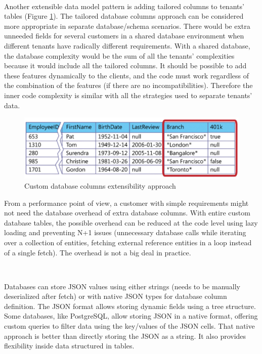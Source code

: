 \documentclass[12pt,english]{article} %
\begin{document}
\

Another extensible data model pattern is adding tailored columns to tenants' tables (Figure \ref{fig:custom-database-columns}).
The tailored database columns approach can be considered more appropriate in separate database/schema scenarios.
There would be extra unneeded fields for several customers in a shared database environment when different tenants have radically different requirements.
With a shared database, the database complexity would be the sum of all the tenants' complexities because it would include all the tailored columns.
It should be possible to add these features dynamically to the clients, and the code must work regardless of the combination of the features (if there are no incompatibilities).
Therefore the inner code complexity is similar with all the strategies used to separate tenants' data.

\begin{figure}[H]
    \centering
    \includegraphics[scale=0.5]{img/db/extensibility/custom-database-columns.png}
    \caption{Custom database columns extensibility approach \cite{multi-tenant-data-architecture}}
    \label{fig:custom-database-columns}
\end{figure}

From a performance point of view, a customer with simple requirements might not need the database overhead of extra database columns. 
With entire custom database tables, the possible overhead can be reduced at the code level using lazy loading and preventing N+1 issues (unnecessary database calls while iterating over a collection of entities, fetching external reference entities in a loop instead of a single fetch).
The overhead is not a big deal in practice.

\

Databases can store JSON values using either strings (needs to be manually deserialized after fetch) or with native JSON types for database column definition.
The JSON format allows storing dynamic fields using a tree structure.
Some databases, like PostgreSQL, allow storing JSON in a native format, offering custom queries to filter data using the key/values of the JSON cells.
That native approach is better than directly storing the JSON as a string.
It also provides flexibility inside data structured in tables.
\end{document}
